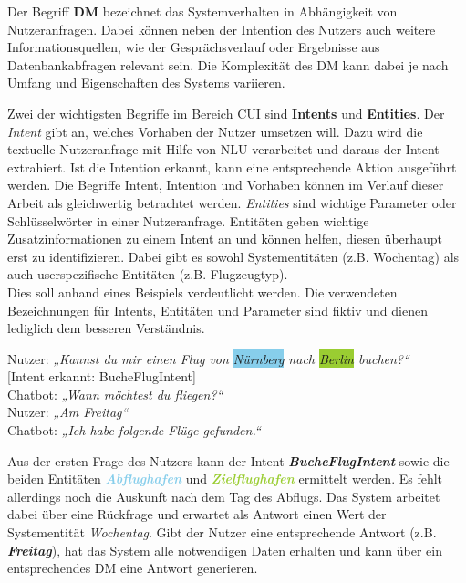 Der Begriff \textbf{\ac{DM}} bezeichnet das Systemverhalten in Abhängigkeit von Nutzeranfragen. Dabei können neben der Intention des Nutzers auch weitere Informationsquellen, wie der Gesprächsverlauf oder Ergebnisse aus Datenbankabfragen relevant sein. Die Komplexität des \ac{DM} kann dabei je nach Umfang und Eigenschaften des Systems variieren. \cite[S. 209-210]{mctear_conversational_2016}

Zwei der wichtigsten Begriffe im Bereich \ac{CUI} sind  \textbf{Intents} und \textbf{Entities}. Der \textit{Intent} gibt an, welches Vorhaben der Nutzer umsetzen will. Dazu wird die textuelle Nutzeranfrage mit Hilfe von \ac{NLU} verarbeitet und daraus der Intent extrahiert. Ist die Intention erkannt, kann eine entsprechende Aktion ausgeführt werden. Die Begriffe Intent, Intention und Vorhaben können im Verlauf dieser Arbeit als gleichwertig betrachtet werden. \textit{Entities} sind wichtige Parameter oder Schlüsselwörter in einer Nutzeranfrage. Entitäten geben wichtige Zusatzinformationen zu einem Intent an und können helfen, diesen überhaupt erst zu identifizieren. Dabei gibt es sowohl Systementitäten (z.B. Wochentag) als auch userspezifische Entitäten (z.B. Flugzeugtyp). \cite[S. 27, 44-45]{khan_build_2018}\cite[S. 12-13]{mitrevski_developing_2018} \\
Dies soll anhand eines Beispiels verdeutlicht werden. Die verwendeten Bezeichnungen für Intents, Entitäten und Parameter sind fiktiv und dienen lediglich dem besseren Verständnis. 

\begin{center}
Nutzer: \textit{„Kannst du mir einen Flug von \colorbox{SkyBlue}{Nürnberg} nach \colorbox{YellowGreen}{Berlin} buchen?“} \\
\colorbox{Peach}{[Intent erkannt: BucheFlugIntent]} \\
Chatbot: \textit{„Wann möchtest du fliegen?“}\\
Nutzer: \textit{„Am \colorbox{Rhodamine}{Freitag}“} \\
Chatbot: \textit{„Ich habe folgende Flüge gefunden.“} \\
\end{center}

Aus der ersten Frage des Nutzers kann der Intent \textbf{\textcolor{Peach}{\textit{BucheFlugIntent}}} sowie die beiden Entitäten \textbf{\textcolor{SkyBlue}{\textit{Abflughafen}}} und \textbf{\textcolor{YellowGreen}{\textit{Zielflughafen}}} ermittelt werden. Es fehlt allerdings noch die Auskunft nach dem Tag des Abflugs. Das System arbeitet dabei über eine Rückfrage und erwartet als Antwort einen Wert der Systementität \textit{Wochentag}. Gibt der Nutzer eine entsprechende Antwort (z.B. \textbf{\textcolor{Rhodamine}{\textit{Freitag}}}), hat das System alle notwendigen Daten erhalten und kann über ein entsprechendes \acl{DM} eine Antwort generieren.

